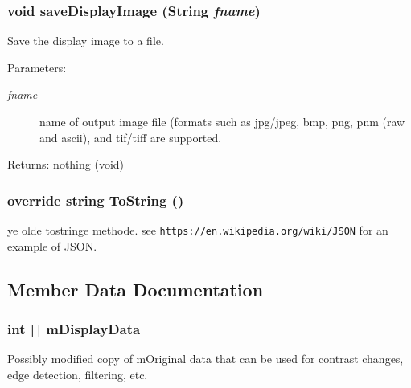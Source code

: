 \subsubsection{\setlength{\rightskip}{0pt plus 5cm}void save\-Display\-Image (String {\em fname})}\label{class_c_s_image_viewer_1_1_image_data_2b0a4698a0a81bc02802c6d3fc7fed04}


Save the display image to a file. 

\begin{Desc}
\item[Parameters:]
\begin{description}
\item[{\em fname}]name of output image file (formats such as jpg/jpeg, bmp, png, pnm (raw and ascii), and tif/tiff are supported. \end{description}
\end{Desc}
\begin{Desc}
\item[Returns:]nothing (void) \end{Desc}
\subsubsection{\setlength{\rightskip}{0pt plus 5cm}override string To\-String ()}\label{class_c_s_image_viewer_1_1_image_data_a73e7c4dd1df5fd5fbf81c7764ee1533}


ye olde tostringe methode. see {\tt https://en.wikipedia.org/wiki/JSON} for an example of JSON. 

\subsection{Member Data Documentation}
\subsubsection{\setlength{\rightskip}{0pt plus 5cm}int [$\,$] {\bf m\-Display\-Data}}\label{class_c_s_image_viewer_1_1_image_data_7c1ea11a57f2825044182dc429af34fe}


Possibly modified copy of m\-Original data that can be used for contrast changes, edge detection, filtering, etc. 

